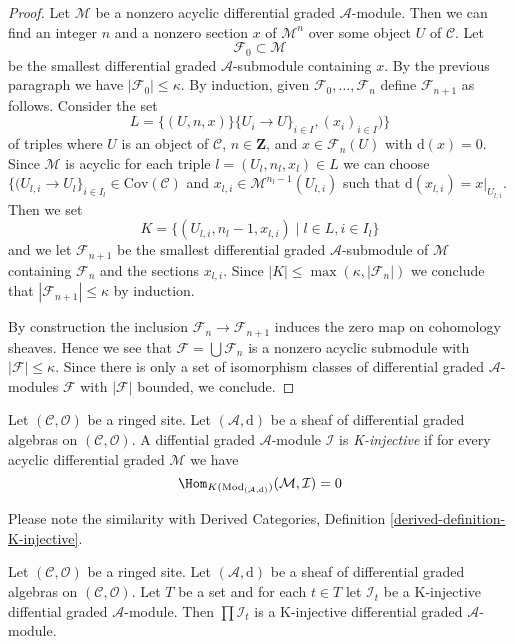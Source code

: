 \begin{proof}
\medskip\noindent
Let $\mathcal{M}$ be a nonzero acyclic differential graded
$\mathcal{A}$-module. Then we can find an integer $n$ and a
nonzero section $x$ of $\mathcal{M}^n$ over some object $U$
of $\mathcal{C}$. Let
$$
\mathcal{F}_0 \subset \mathcal{M}
$$
be the smallest differential graded $\mathcal{A}$-submodule
containing $x$. By the previous paragraph we have
$|\mathcal{F}_0| \leq \kappa$. By induction, given
$\mathcal{F}_0, \ldots, \mathcal{F}_n$ define
$\mathcal{F}_{n + 1}$ as follows. Consider the set
$$
L = \{(U, n, x)\}
\{U_i \to U\}_{i \in I}, (x_i)_{i \in I})\}
$$
of triples where $U$ is an object of $\mathcal{C}$, $n \in \mathbf{Z}$,
and $x \in \mathcal{F}_n(U)$ with $\text{d}(x) = 0$. Since
$\mathcal{M}$ is acyclic for each triple $l = (U_l, n_l, x_l) \in L$
we can choose
$\{(U_{l, i} \to U_l\}_{i \in I_l} \in \text{Cov}(\mathcal{C})$ and
$x_{l, i} \in \mathcal{M}^{n_l - 1}(U_{l, i})$ such that
$\text{d}(x_{l, i}) = x|_{U_{l, i}}$. Then we set
$$
K = \{(U_{l, i}, n_l - 1, x_{l, i}) \mid l \in L, i \in I_l\}
$$
and we let $\mathcal{F}_{n + 1}$ be the smallest differential
graded $\mathcal{A}$-submodule of $\mathcal{M}$ containing
$\mathcal{F}_n$ and the sections $x_{l, i}$.
Since $|K| \leq \max(\kappa, |\mathcal{F}_n|)$
we conclude that $|\mathcal{F}_{n + 1}| \leq \kappa$ by induction.

\medskip\noindent
By construction the inclusion $\mathcal{F}_n \to \mathcal{F}_{n + 1}$
induces the zero map on cohomology sheaves. Hence we see that
$\mathcal{F} = \bigcup \mathcal{F}_n$ is a nonzero acyclic submodule
with $|\mathcal{F}| \leq \kappa$. Since there is only a set
of isomorphism classes of differential graded $\mathcal{A}$-modules
$\mathcal{F}$ with $|\mathcal{F}|$ bounded, we conclude.
\end{proof}

\begin{definition}
\label{definition-K-injective}
Let $(\mathcal{C}, \mathcal{O})$ be a ringed site.
Let $(\mathcal{A}, \text{d})$ be a sheaf of differential graded algebras
on $(\mathcal{C}, \mathcal{O})$. A diffential graded $\mathcal{A}$-module
$\mathcal{I}$ is {\it K-injective} if for every acyclic
differential graded $\mathcal{M}$ we have 
$$
\Hom_{K(\text{Mod}_{(\mathcal{A}, \text{d})})}(\mathcal{M}, \mathcal{I}) = 0
$$
\end{definition}

\noindent
Please note the similarity with
Derived Categories, Definition \ref{derived-definition-K-injective}.

\begin{lemma}
\label{lemma-product-K-injective}
Let $(\mathcal{C}, \mathcal{O})$ be a ringed site.
Let $(\mathcal{A}, \text{d})$ be a sheaf of differential graded algebras
on $(\mathcal{C}, \mathcal{O})$. Let $T$ be a set and for
each $t \in T$ let $\mathcal{I}_t$ be a K-injective
diffential graded $\mathcal{A}$-module. Then
$\prod \mathcal{I}_t$ is a K-injective differential
graded $\mathcal{A}$-module.
\end{lemma}

